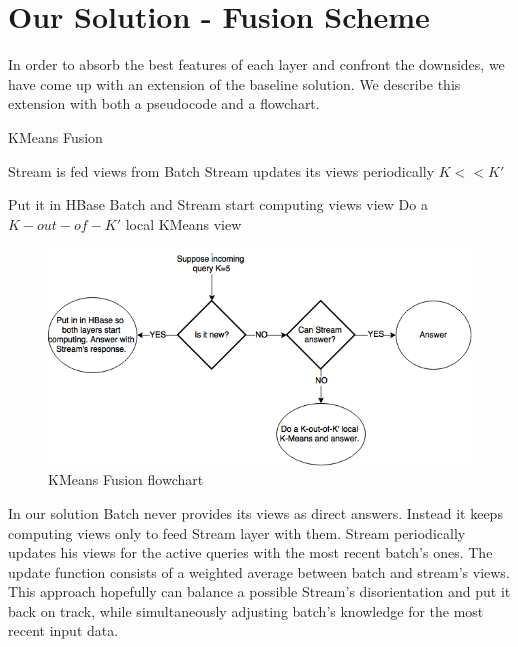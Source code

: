 \documentclass{lmproj}
\begin{document}
\section{Our Solution - Fusion Scheme}
\label{kmeans}

In order to absorb the best features of each layer and confront the downsides, we have come up with an extension of the baseline solution. We describe this extension with both a pseudocode and a flowchart.


\bigskip
	\begin{algorithm}[H]
		\caption{KMeans Fusion}\label{kmeansFusion}
		\begin{algorithmic}[1]
			\Require Stream is fed views from Batch
			\Require Stream updates its views periodically
			\Require $K<<K'$
			
				\State Put it in HBase
				\State Batch and Stream start computing views
			\Else 
					\State \Return view
				\Else 
					\State Do a $K-out-of-K'$ local KMeans
					\State \Return view
				\EndIf
			\EndIf			
			
			\EndProcedure
		\end{algorithmic}
	\end{algorithm}

\bigskip

\begin{figure}[H]
	\centering	
	\includegraphics[scale=0.5]{usecase}
	\caption{KMeans Fusion flowchart}
\end{figure}


In our solution Batch never provides its views as direct answers. Instead it keeps computing views only to feed Stream layer with them. Stream periodically updates his views for the active queries with the most recent batch's ones. The update function consists of a weighted average between batch and stream's views. This approach hopefully can balance a possible Stream's disorientation and put it back on track, while simultaneously adjusting batch's knowledge for the most recent input data.
\end{document}

